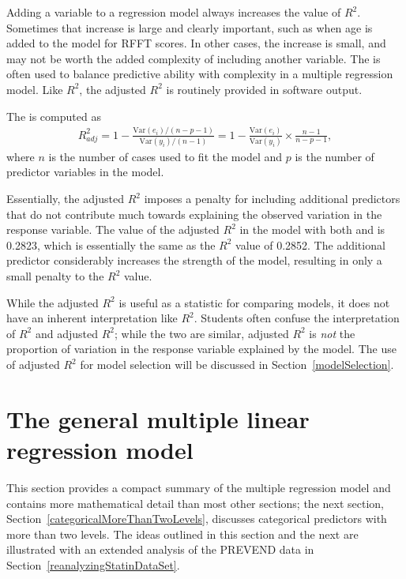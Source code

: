 Adding a variable to a regression model always increases the value of $R^2$. Sometimes that increase is large and clearly important, such as when age is added to the model for RFFT scores. In other cases, the increase is small, and may not be worth the added complexity of including another variable. The  is often used to balance predictive ability with complexity in a multiple regression model. Like $R^2$, the adjusted $R^2$ is routinely provided in software output. 

\begin{termBox}{
The  is computed as
\begin{align*}
R_{adj}^{2} = 1-\frac{\text{Var}(e_i) / (n-p-1)}{\text{Var}(y_i) / (n-1)}
	= 1-\frac{\text{Var}(e_i)}{\text{Var}(y_i)} \times
    \frac{n-1}{n-p-1},
\end{align*}
where $n$ is the number of cases used to fit the model and $p$ is the number of predictor variables in the model.}
\end{termBox}

Essentially, the adjusted $R^2$ imposes a penalty for including additional predictors that do not contribute much towards explaining the observed variation in the response variable. The value of the adjusted $R^2$ in the model with both  and  is 0.2823, which is essentially the same as the $R^2$ value of 0.2852. The additional predictor  considerably increases the strength of the model, resulting in only a small penalty to the $R^2$ value.

While the adjusted $R^2$ is useful as a statistic for comparing models, it does not have an inherent interpretation like $R^2$. Students often confuse the interpretation of $R^2$ and adjusted $R^2$; while the two are similar, adjusted $R^2$ is \emph{not} the proportion of variation in the response variable explained by the model. The use of adjusted $R^2$ for model selection will be discussed in Section~\ref{modelSelection}.


\newpage

\section{The general multiple linear regression model}
\label{generalMultipleRegression}
 
This section provides a compact summary of the multiple regression model and contains more mathematical detail than most other sections; the next section, Section~\ref{categoricalMoreThanTwoLevels}, discusses categorical predictors with more than two levels. The ideas outlined in this section and the next are illustrated with an extended analysis of the PREVEND data in Section~\ref{reanalyzingStatinDataSet}. 
 
